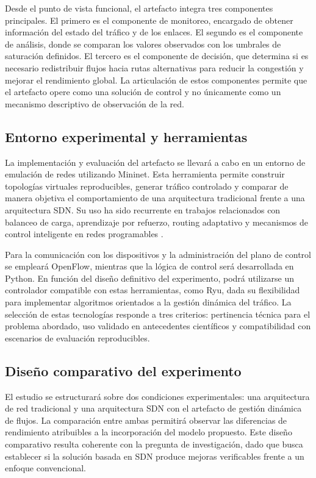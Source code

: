 \documentclass[12pt,a4paper]{article}
\begin{document}
Desde el punto de vista funcional, el artefacto integra tres componentes principales. El primero es el componente de monitoreo, encargado de obtener información del estado del tráfico y de los enlaces. El segundo es el componente de análisis, donde se comparan los valores observados con los umbrales de saturación definidos. El tercero es el componente de decisión, que determina si es necesario redistribuir flujos hacia rutas alternativas para reducir la congestión y mejorar el rendimiento global. La articulación de estos componentes permite que el artefacto opere como una solución de control y no únicamente como un mecanismo descriptivo de observación de la red.

\subsection{Entorno experimental y herramientas}

La implementación y evaluación del artefacto se llevará a cabo en un entorno de emulación de redes utilizando Mininet. Esta herramienta permite construir topologías virtuales reproducibles, generar tráfico controlado y comparar de manera objetiva el comportamiento de una arquitectura tradicional frente a una arquitectura SDN. Su uso ha sido recurrente en trabajos relacionados con balanceo de carga, aprendizaje por refuerzo, routing adaptativo y mecanismos de control inteligente en redes programables \parencite{ddqn_sdn, dynamic_lb_sdn, cognitive_routing_sdn, qos_lb_sdn}.

Para la comunicación con los dispositivos y la administración del plano de control se empleará OpenFlow, mientras que la lógica de control será desarrollada en Python. En función del diseño definitivo del experimento, podrá utilizarse un controlador compatible con estas herramientas, como Ryu, dada su flexibilidad para implementar algoritmos orientados a la gestión dinámica del tráfico. La selección de estas tecnologías responde a tres criterios: pertinencia técnica para el problema abordado, uso validado en antecedentes científicos y compatibilidad con escenarios de evaluación reproducibles.

\subsection{Diseño comparativo del experimento}

El estudio se estructurará sobre dos condiciones experimentales: una arquitectura de red tradicional y una arquitectura SDN con el artefacto de gestión dinámica de flujos. La comparación entre ambas permitirá observar las diferencias de rendimiento atribuibles a la incorporación del modelo propuesto. Este diseño comparativo resulta coherente con la pregunta de investigación, dado que busca establecer si la solución basada en SDN produce mejoras verificables frente a un enfoque convencional.
\end{document}
